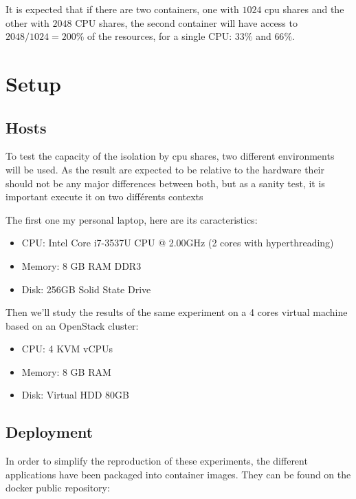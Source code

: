 It is expected that if there are two containers, one with $1024$ cpu shares and
the other with $2048$ CPU shares, the second container will have access to
$2048/1024 = 200\%$ of the resources, for a single CPU: $33\%$ and $66\%$.

\section{Setup}

\subsection{Hosts}

To test the capacity of the isolation by cpu shares, two different environments
will be used. As the result are expected to be relative to the hardware their
should not be any major differences between both, but as a sanity test, it is
important execute it on two différents contexts

The first one my personal laptop, here are its caracteristics:

\begin{itemize}
	\item{CPU: Intel\textregistered \hspace{1pt} Core\texttrademark
	\hspace{1pt} i7-3537U CPU @ 2.00GHz (2 cores with hyperthreading)}
	\item{Memory: 8 GB RAM DDR3}
	\item{Disk: 256GB Solid State Drive}
\end{itemize}

Then we'll study the results of the same experiment on a 4 cores virtual
machine based on an OpenStack cluster:

\begin{itemize}
	\item{CPU: 4 KVM vCPUs}
	\item{Memory: 8 GB RAM}
	\item{Disk: Virtual HDD 80GB}
\end{itemize}

\subsection{Deployment}

In order to simplify the reproduction of these experiments, the different
applications have been packaged into container images. They can be found on the
docker public repository:

